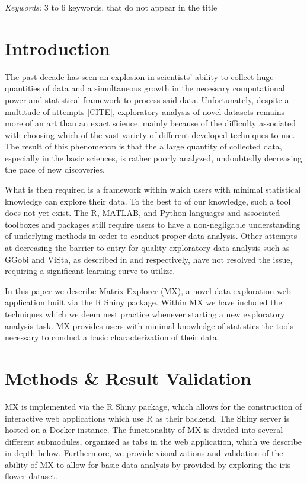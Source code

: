 \documentclass[12pt]{article}
\begin{document}
\noindent%
{\it Keywords:}  3 to 6 keywords, that do not appear in the title
\vfill

\newpage
{} %
\section{Introduction}
\label{sec:intro}

The past decade has seen an explosion in scientists' ability to collect huge quantities of data and a simultaneous growth in the necessary computational power and statistical framework to process said data. Unfortunately, despite a multitude of attempts [CITE], exploratory analysis of novel datasets remains more of an art than an exact science, mainly because of the difficulty associated with choosing which of the vast variety of different developed techniques to use. The result of this phenomenon is that the a large quantity of collected data, especially in the basic sciences, is rather poorly analyzed, undoubtedly decreasing the pace of new discoveries.

What is then required is a framework within which users with minimal statistical knowledge can explore their data. To the best to of our knowledge, such a tool does not yet exist. The R, MATLAB, and Python languages and associated toolboxes and packages still require users to have a non-negligable understanding of underlying methods in order to conduct proper data analysis. Other attempts at decreasing the barrier to entry for quality exploratory data analysis such as GGobi and ViSta, as described in \cite{swayne2003ggobi} and \cite{valero2011using} respectively, have not resolved the issue, requiring a significant learning curve to utilize.

In this paper we describe Matrix Explorer (MX), a novel data exploration web application built via the R Shiny package. Within MX we have included the techniques which we deem nest practice whenever starting a new exploratory analysis task. MX provides users with minimal knowledge of statistics the tools necessary to conduct a basic characterization of their data.

\section{Methods \& Result Validation}
\label{sec:meth}

MX is implemented via the R Shiny package, which allows for the construction of interactive web applications which use R as their backend. The Shiny server is hosted on a Docker instance. The functionality of MX is divided into several different submodules, organized as tabs in the web application, which we  describe in depth below. Furthermore, we provide visualizations and validation of the ability of MX to allow for basic data analysis by provided by exploring the iris flower dataset. 
\end{document}
